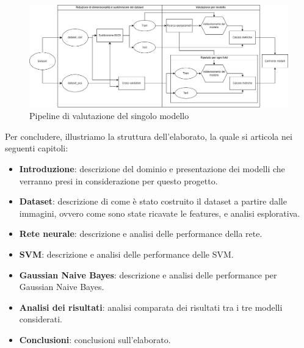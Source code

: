 \begin{figure}
      \centering
      \includegraphics[width=\textwidth]{img/introduzione/schema_pipeline_valutazione_modelli.png}
      \caption{Pipeline di valutazione del singolo modello}
      \label{fig:pipeline}
\end{figure}

Per concludere, illustriamo la struttura dell'elaborato, la quale si articola
nei seguenti capitoli:
\begin{itemize}
    \item \textbf{Introduzione}: descrizione del dominio e presentazione dei
          modelli che verranno presi in considerazione per questo progetto.
    \item \textbf{Dataset}: descrizione di come è stato costruito il dataset a
          partire dalle immagini, ovvero come sono state ricavate le features, e
          analisi esplorativa.
    \item \textbf{Rete neurale}: descrizione e analisi delle performance della
          rete.
    \item \textbf{SVM}: descrizione e analisi delle performance delle SVM.
    \item \textbf{Gaussian Naive Bayes}: descrizione e analisi delle performance
          per Gaussian Naive Bayes.
    \item \textbf{Analisi dei risultati}: analisi comparata dei risultati tra i
          tre modelli considerati.
    \item \textbf{Conclusioni}: conclusioni sull'elaborato.
\end{itemize}